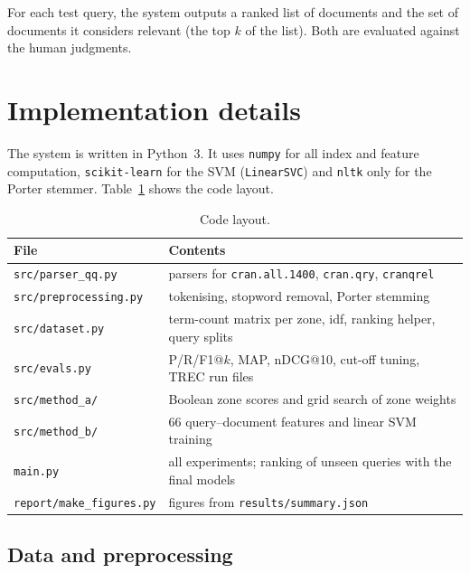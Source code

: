 \documentclass[11pt,a4paper]{article}
\newcommand{\code}[1]{\texttt{#1}}
\begin{document}
For each test query, the system outputs a ranked list of documents and the set of documents
it considers relevant (the top $k$ of the list). Both are evaluated against the human
judgments.

\section{Implementation details}

The system is written in Python~3. It uses \code{numpy} for all index and feature
computation, \code{scikit-learn} for the SVM (\code{LinearSVC}) and \code{nltk} only for the
Porter stemmer. Table~\ref{tab:files} shows the code layout.

\begin{table}[H]
\centering
\small
\begin{tabularx}{\linewidth}{lX}
\toprule
\textbf{File} & \textbf{Contents} \\
\midrule
\code{src/parser\_qq.py}       & parsers for \code{cran.all.1400}, \code{cran.qry}, \code{cranqrel} \\
\code{src/preprocessing.py}    & tokenising, stopword removal, Porter stemming \\
\code{src/dataset.py}          & term-count matrix per zone, idf, ranking helper, query splits \\
\code{src/evals.py}            & P/R/F1@$k$, MAP, nDCG@10, cut-off tuning, TREC run files \\
\code{src/method\_a/}          & Boolean zone scores and grid search of zone weights \\
\code{src/method\_b/}          & 66 query--document features and linear SVM training \\
\code{main.py}                 & all experiments; ranking of unseen queries with the final models \\
\code{report/make\_figures.py} & figures from \code{results/summary.json} \\
\bottomrule
\end{tabularx}
\caption{Code layout.}
\label{tab:files}
\end{table}

\subsection{Data and preprocessing}
\end{document}
